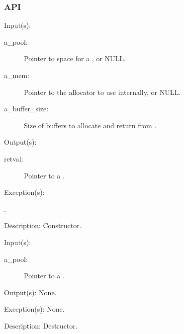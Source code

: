 \subsubsection{API}
\begin{capi}
\label{pool_new}
	\begin{capilist}
	\item[Input(s): ]
		\begin{description}\item[]
		\item[a\_pool: ]
			Pointer to space for a , or NULL.
		\item[a\_mem: ]
			Pointer to the allocator to use internally, or NULL.
		\item[a\_buffer\_size: ]
			Size of buffers to allocate and return from
			.
		\end{description}
	\item[Output(s): ]
		\begin{description}\item[]
		\item[retval: ]
			Pointer to a .
		\end{description}
	\item[Exception(s): ]
		\begin{description}\item[]
		\item[.]
		\end{description}
	\item[Description: ]
		Constructor.
	\end{capilist}
\label{pool_delete}
	\begin{capilist}
	\item[Input(s): ]
		\begin{description}\item[]
		\item[a\_pool: ]
			Pointer to a \classname{pool}.
		\end{description}
	\item[Output(s): ] None.
	\item[Exception(s): ] None.
	\item[Description: ]
		Destructor.
	\end{capilist}
\label{pool_buffer_size_get}

\end{capi}
